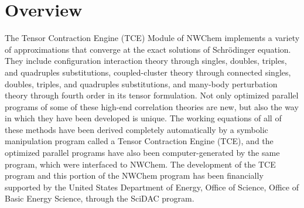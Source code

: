 \label{sec:tce}

\section{Overview}

The Tensor Contraction Engine (TCE) Module of NWChem implements 
a variety of approximations that converge at the exact solutions
of Schr\"{o}dinger equation.  They include configuration interaction theory
through singles, doubles, triples, and quadruples substitutions,
coupled-cluster theory through connected singles, doubles, triples, and quadruples substitutions,
and many-body perturbation theory through fourth order in its 
tensor formulation.  Not only optimized parallel programs of some
of these high-end correlation theories are new, but also the way in
which they have been developed is unique.  The working equations
of all of these methods have been derived completely automatically by
a symbolic manipulation program called a Tensor Contraction Engine (TCE),
and the optimized parallel programs have also been computer-generated by the same program,
which were interfaced to NWChem.  The development of the TCE
program and this portion of the NWChem program has been financially 
supported by the United States Department of Energy, Office of Science,
Office of Basic Energy Science, through the SciDAC program.

